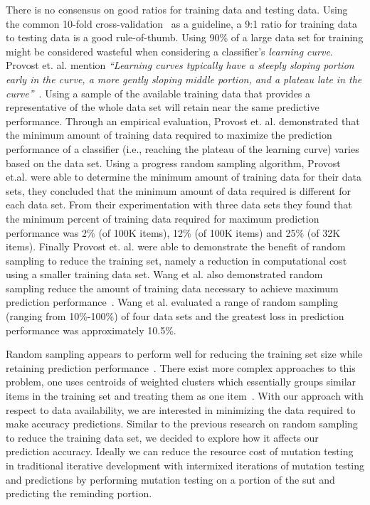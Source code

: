 There is no consensus on good ratios for training data and testing data. Using the common 10-fold cross-validation~\cite{Koh95} as a guideline, a 9:1 ratio for training data to testing data is a good rule-of-thumb. Using 90\% of a large data set for training might be considered wasteful when considering a classifier's \emph{learning curve}. Provost et. al. mention \emph{``Learning curves typically have a steeply sloping portion early in the curve, a more gently sloping middle portion, and a plateau late in the curve''}~\cite{PJO99}. Using a sample of the available training data that provides a representative of the whole data set will retain near the same predictive performance. Through an empirical evaluation, Provost et. al. demonstrated that the minimum amount of training data required to maximize the prediction performance of a classifier (i.e., reaching the plateau of the learning curve) varies based on the data set. Using a progress random sampling algorithm, Provost et.al. were able to determine the minimum amount of training data for their data sets, they concluded that the minimum amount of data required is different for each data set. From their experimentation with three data sets they found that the minimum percent of training data required for maximum prediction performance was 2\% (of 100K items), 12\% (of 100K items) and 25\% (of 32K items). Finally Provost et. al. were able to demonstrate the benefit of random sampling to reduce the training set, namely a reduction in computational cost using a smaller training data set. Wang et al. also demonstrated random sampling reduce the amount of training data necessary to achieve maximum prediction performance~\cite{WNC05}. Wang et al. evaluated a range of random sampling (ranging from 10\%-100\%) of four data sets and the greatest loss in prediction performance was approximately 10.5\%. 

Random sampling appears to perform well for reducing the training set size while retaining prediction performance~\cite{PJO99, WNC05}. There exist more complex approaches to this problem, one uses centroids of weighted clusters which essentially groups similar items in the training set and treating them as one item~\cite{NBP08}. With our approach with respect to data availability, we are interested in minimizing the data required to make accuracy predictions. Similar to the previous research on random sampling to reduce the training data set, we decided to explore how it affects our prediction accuracy. Ideally we can reduce the resource cost of mutation testing in traditional iterative development with intermixed iterations of mutation testing and predictions by performing mutation testing on a portion of the \gls{sut} and predicting the reminding portion. 

